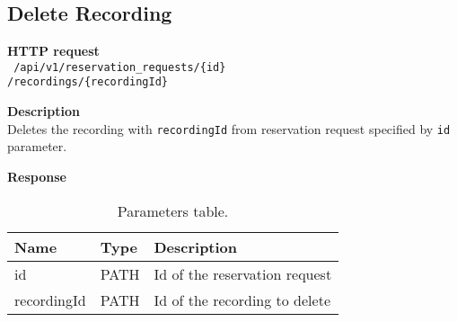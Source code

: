 \subsection{Delete Recording}
\begin{description}
    \item \textbf{HTTP request}\\
        \texttt{\text{[DELETE]} /api/v1/reservation\_requests/\{id\}\\/recordings/\{recordingId\}}
    \item \textbf{Description}\\
        Deletes the recording with \texttt{recordingId} from reservation request specified by \texttt{id} parameter.
    \item \textbf{Response}\\
        \texttt{\text{[200 OK]}}
\end{description}
\begin{table}[ht!]
    \begin{tabularx}{\textwidth}{llX}
        \toprule
        Name & Type & Description \\
        \midrule
        id & PATH & Id of the reservation request \\ 
        recordingId & PATH & Id of the recording to delete \\
        \bottomrule
        \end{tabularx}
    \caption{Parameters table.}
\end{table}
